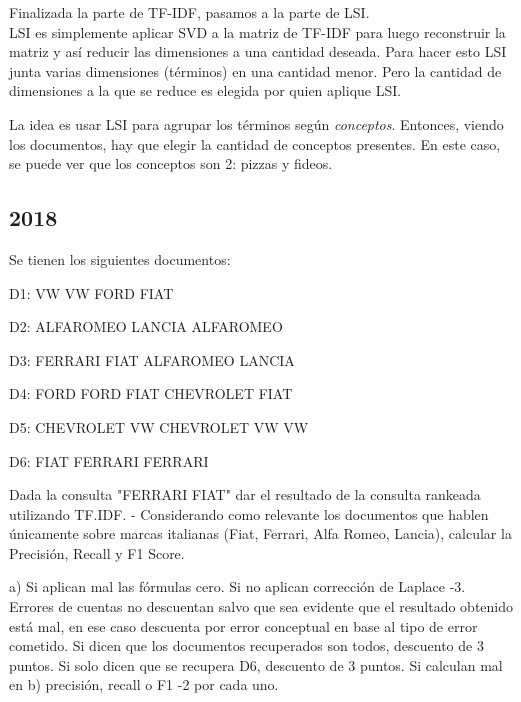 \documentclass[a4paper]{article}
\newenvironment{enunciado}[3]{%
    \vspace{\baselineskip}
    \tcolorbox[beamer,%
    noparskip,breakable,
    colback=LightGreen,colframe=DarkGreen,%
    colbacklower=LimeGreen!75!LightGreen,%
    title=\small Enunciado: Año #1\, Cuatrimestre #2\, Oportunidad #3]}%
    {\endtcolorbox}
\newenvironment{criterio}[3]{%
    \tcolorbox[beamer,%
    noparskip,breakable,
    colback=LightCoral,colframe=DarkRed,%
    colbacklower=Tomato!75!LightCoral,%
    title=\small Criterio de Corrección: Año #1\, Cuatrimestre #2\, Oportunidad #3]}%
    {\endtcolorbox}
\begin{document}
    Finalizada la parte de TF-IDF, pasamos a la parte de LSI. \\

    LSI es simplemente aplicar SVD a la matriz de TF-IDF para luego reconstruir la matriz y así reducir las dimensiones a una cantidad deseada. Para hacer esto LSI junta varias dimensiones (términos) en una cantidad menor. Pero la cantidad de dimensiones a la que se reduce es elegida por quien aplique LSI.

    La idea es usar LSI para agrupar los términos según \textit{conceptos}. Entonces, viendo los documentos, hay que elegir la cantidad de conceptos presentes. En este caso, se puede ver que los conceptos son 2: pizzas y fideos.

    \subsection{2018}
    
	\begin{enunciado}{2018}{1}{1}
    	Se tienen los siguientes documentos: 
        
        D1: VW VW FORD FIAT 
        
        D2: ALFAROMEO LANCIA ALFAROMEO 
        
        D3: FERRARI FIAT ALFAROMEO LANCIA 
        
        D4: FORD FORD FIAT CHEVROLET FIAT 
        
        D5: CHEVROLET VW CHEVROLET VW VW 
        
        D6: FIAT FERRARI FERRARI
        
        Dada la consulta "FERRARI FIAT" dar el resultado de la consulta rankeada utilizando TF.IDF. - Considerando como  relevante los documentos que hablen  únicamente sobre marcas  italianas  (Fiat,  Ferrari,  Alfa  Romeo,  Lancia),  calcular  la  Precisión, Recall y F1 Score.
    \end{enunciado}

    \begin{criterio}{2018}{1}{1}
        a)  Si aplican mal las fórmulas cero. Si no aplican corrección de Laplace -3. Errores de cuentas no descuentan salvo que sea evidente que el resultado obtenido está mal, en ese caso descuenta por error conceptual en base al tipo de error cometido. Si dicen que los documentos recuperados son todos, descuento de 3 puntos. Si solo dicen que se recupera D6, descuento de 3 puntos. Si calculan mal en b) precisión, recall o F1 -2 por cada uno. 
    \end{criterio}
\end{document}
